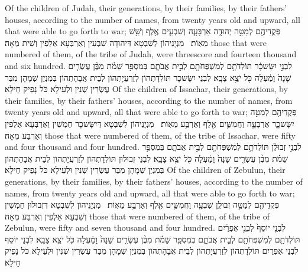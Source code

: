 {Of the children of Judah, their generations, by their families, by their fathers’ houses, according to the number of names, from twenty years old and upward, all that were able to go forth to war;}{}
{פְּקֻדֵיהֶ֖ם לְמַטֵּ֣ה יְהוּדָ֑ה אַרְבָּעָ֧ה וְשִׁבְעִ֛ים אֶ֖לֶף וְשֵׁ֥שׁ מֵאֽוֹת׃ \petucha }
{מִנְיָנֵיהוֹן לְשִׁבְטָא דִּיהוּדָה שִׁבְעִין וְאַרְבְּעָא אַלְפִין וְשֵׁית מְאָה׃}
{those that were numbered of them, of the tribe of Judah, were threescore and fourteen thousand and six hundred.}{}
{לִבְנֵ֣י יִשָּׂשכָ֔ר תּוֹלְדֹתָ֥ם לְמִשְׁפְּחֹתָ֖ם לְבֵ֣ית אֲבֹתָ֑ם בְּמִסְפַּ֣ר שֵׁמֹ֗ת מִבֶּ֨ן עֶשְׂרִ֤ים שָׁנָה֙ וָמַ֔עְלָה כֹּ֖ל יֹצֵ֥א צָבָֽא׃}
{לִבְנֵי יִשָּׂשכָר תּוֹלְדָתְהוֹן לְזַרְעֲיָתְהוֹן לְבֵית אֲבָהָתְהוֹן בְּמִנְיַן שְׁמָהָן מִבַּר עֶשְׂרִין שְׁנִין וּלְעֵילָא כֹּל נָפֵיק חֵילָא׃}
{Of the children of Issachar, their generations, by their families, by their fathers’ houses, according to the number of names, from twenty years old and upward, all that were able to go forth to war;}{}
{פְּקֻדֵיהֶ֖ם לְמַטֵּ֣ה יִשָּׂשכָ֑ר אַרְבָּעָ֧ה וַחֲמִשִּׁ֛ים אֶ֖לֶף וְאַרְבַּ֥ע מֵאֽוֹת׃ \petucha }
{מִנְיָנֵיהוֹן לְשִׁבְטָא דְּיִשָּׂשכָר חַמְשִׁין וְאַרְבְּעָא אַלְפִין וְאַרְבַּע מְאָה׃}
{those that were numbered of them, of the tribe of Issachar, were fifty and four thousand and four hundred.}{}
{לִבְנֵ֣י זְבוּלֻ֔ן תּוֹלְדֹתָ֥ם לְמִשְׁפְּחֹתָ֖ם לְבֵ֣ית אֲבֹתָ֑ם בְּמִסְפַּ֣ר שֵׁמֹ֗ת מִבֶּ֨ן עֶשְׂרִ֤ים שָׁנָה֙ וָמַ֔עְלָה כֹּ֖ל יֹצֵ֥א צָבָֽא׃}
{לִבְנֵי זְבוּלוּן תּוֹלְדָתְהוֹן לְזַרְעֲיָתְהוֹן לְבֵית אֲבָהָתְהוֹן בְּמִנְיַן שְׁמָהָן מִבַּר עֶשְׂרִין שְׁנִין וּלְעֵילָא כֹּל נָפֵיק חֵילָא׃}
{Of the children of Zebulun, their generations, by their families, by their fathers’ houses, according to the number of names, from twenty years old and upward, all that were able to go forth to war;}{}
{פְּקֻדֵיהֶ֖ם לְמַטֵּ֣ה זְבוּלֻ֑ן שִׁבְעָ֧ה וַחֲמִשִּׁ֛ים אֶ֖לֶף וְאַרְבַּ֥ע מֵאֽוֹת׃ \petucha }
{מִנְיָנֵיהוֹן לְשִׁבְטָא דִּזְבוּלוּן חַמְשִׁין וְשִׁבְעָא אַלְפִין וְאַרְבַּע מְאָה׃}
{those that were numbered of them, of the tribe of Zebulun, were fifty and seven thousand and four hundred.}{}
{לִבְנֵ֤י יוֹסֵף֙ לִבְנֵ֣י אֶפְרַ֔יִם תּוֹלְדֹתָ֥ם לְמִשְׁפְּחֹתָ֖ם לְבֵ֣ית אֲבֹתָ֑ם בְּמִסְפַּ֣ר שֵׁמֹ֗ת מִבֶּ֨ן עֶשְׂרִ֤ים שָׁנָה֙ וָמַ֔עְלָה כֹּ֖ל יֹצֵ֥א צָבָֽא׃}
{לִבְנֵי יוֹסֵף לִבְנֵי אֶפְרַיִם תּוֹלְדָתְהוֹן לְזַרְעֲיָתְהוֹן לְבֵית אֲבָהָתְהוֹן בְּמִנְיַן שְׁמָהָן מִבַּר עֶשְׂרִין שְׁנִין וּלְעֵילָא כֹּל נָפֵיק חֵילָא׃}
